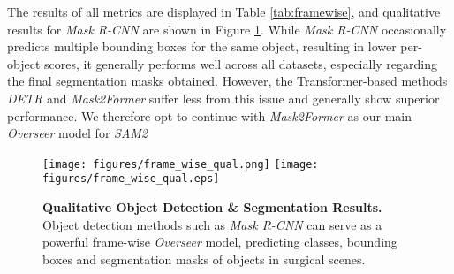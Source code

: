 The results of all metrics are displayed in Table \ref{tab:framewise}, and qualitative results for \emph{Mask R-CNN} are shown in Figure \ref{fig:frame_qual}. While \emph{Mask R-CNN} occasionally predicts multiple bounding boxes for the same object, resulting in lower per-object scores, it generally performs well across all datasets, especially regarding the final segmentation masks obtained.
However, the Transformer-based methods \emph{DETR} and \emph{Mask2Former} suffer less from this issue and generally show superior performance. We therefore opt to continue with \emph{Mask2Former} as our main \emph{Overseer} model for \emph{SAM2}

\begin{table}[htbp]
    \centering
    \caption{\textbf{Per-Frame Overseer Object Detection \& Segmentation Results.}}
    \label{tab:framewise}
\end{table}

\begin{figure}[htbp]
    \centering
    \if{}
        \texttt{[image: figures/frame\_wise\_qual.png]}
    \else
        \texttt{[image: figures/frame\_wise\_qual.eps]}
    \fi
    \caption{\textbf{Qualitative Object Detection \& Segmentation Results.} Object detection methods such as \emph{Mask R-CNN} can serve as a powerful frame-wise \emph{Overseer} model, predicting classes, bounding boxes and segmentation masks of objects in surgical scenes.}
    \label{fig:frame_qual}
\end{figure}

